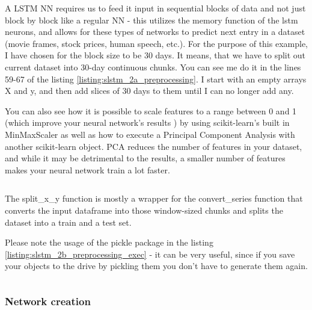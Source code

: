 \documentclass[12pt, a4paper]{article}
\begin{document}
A LSTM NN requires us to feed it input in sequential blocks of data and not just block by block like a regular NN - this utilizes the memory function of the lstm neurons, and allows for these types of networks to predict next entry in a dataset (movie frames, stock prices, human speech, etc.). For the purpose of this example, I have chosen for the block size to be 30 days. It means, that we have to split out current dataset into 30-day continuous chunks. You can see me do it in the lines 59-67 of the listing \ref{listing:slstm_2a_preprocessing}. I start with an empty arrays X and y, and then add slices of 30 days to them until I can no longer add any.

You can also see how it is possible to scale features to a range between 0 and 1 (which improve your neural network's results \cite{muller2016introduction} \cite{grus2015data}) by using scikit-learn's\cite{pedregosa2011scikit} built in MinMaxScaler as well as how to execute a Principal Component Analysis\cite{wold1987principal} with another scikit-learn object. PCA reduces the number of features in your dataset, and while it may be detrimental to the results, a smaller number of features makes your neural network train a lot faster.

\bgroup
  \inputminted[linenos, breaklines=true, fontsize=\scriptsize, firstnumber=last]{python}{src/stocks/lstm/2a_preprocessing.py}
  \label{listing:slstm_2a_preprocessing}
\egroup

The split\_x\_y function is mostly a wrapper for the convert\_series function that converts the input dataframe into those window-sized chunks and splits the dataset into a train and a test set.

Please note the usage of the pickle package in the listing \ref{listing:slstm_2b_preprocessing_exec} - it can be very useful, since if you save your objects to the drive by pickling them you don't have to generate them again.

\bgroup
  \inputminted[linenos, breaklines=true, fontsize=\scriptsize, firstnumber=last]{python}{src/stocks/lstm/2b_preprocessing_exec.py}
  \label{listing:slstm_2b_preprocessing_exec}
\egroup

\subsubsection{Network creation}
\end{document}
